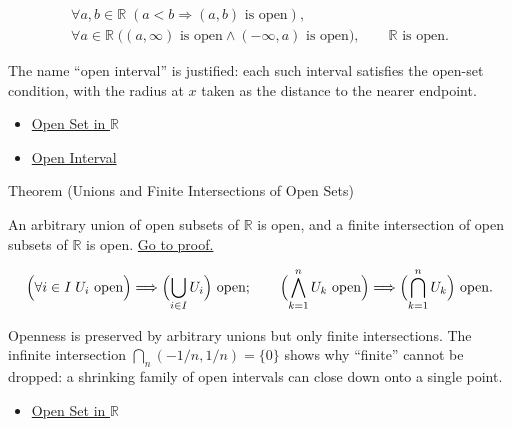 \begin{remark*}
\[
\begin{gathered}
\forall a,b\in\mathbb{R}\;(a<b\Longrightarrow (a,b)\text{ is open}),\\
\forall a\in\mathbb{R}\;\bigl((a,\infty)\text{ is open}\land(-\infty,a)\text{ is open}\bigr),
\qquad \mathbb{R}\text{ is open}.
\end{gathered}
\]
\end{remark*}
\begin{remark*}[Interpretation]
The name ``open interval'' is justified: each such interval satisfies the open-set condition, with the radius at $x$ taken as the distance to the nearer endpoint.
\end{remark*}
\begin{dependencies}
\begin{itemize}
  \item \hyperref[def:open-set]{Open Set in $\mathbb{R}$}
  \item \hyperref[def:open-interval]{Open Interval}
\end{itemize}
\end{dependencies}
\begin{theorembox}{Theorem (Unions and Finite Intersections of Open Sets)}
\begin{theorem}
\label{thm:open-set-closure-operations}
An arbitrary union of open subsets of $\mathbb{R}$ is open, and a finite intersection of open subsets of $\mathbb{R}$ is open.
\hyperref[prf:open-set-closure-operations]{Go to proof.}
\end{theorem}
\end{theorembox}
\begin{remark*}
\[
\Bigl(\forall i\in I\;U_i\text{ open}\Bigr)\Longrightarrow \Bigl(\bigcup_{i\in I} U_{i}\Bigr) \text{ open};\qquad
\Bigl(\bigwedge_{k=1}^{n} U_k\text{ open}\Bigr)\Longrightarrow \Bigl(\bigcap_{k=1}^{n} U_{k}\Bigr) \text{ open}.
\]
\end{remark*}
\begin{remark*}[Interpretation]
Openness is preserved by arbitrary unions but only finite intersections. The infinite intersection $\bigcap_n(-1/n,1/n)=\{0\}$ shows why ``finite'' cannot be dropped: a shrinking family of open intervals can close down onto a single point.
\end{remark*}
\begin{dependencies}
\begin{itemize}
  \item \hyperref[def:open-set]{Open Set in $\mathbb{R}$}
\end{itemize}
\end{dependencies}

